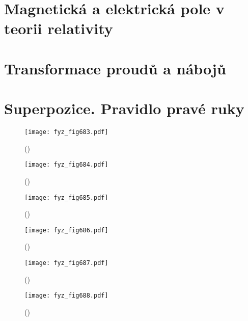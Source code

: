   \section{ Magnetická a elektrická pole v teorii relativity}\label{fyz:IIchapXIIIsecVI}
  \section{Transformace proudů a nábojů}\label{fyz:IIchapXIIIsecVII}
  \section{Superpozice. Pravidlo pravé ruky}\label{fyz:IIchapXIIIsecVIII}


    \begin{figure}[ht!] %
      \centering
      \texttt{[image: fyz\_fig683.pdf]}
      \caption{
               (\cite[s.~707]{Feynman02})}
      \label{fyz_fig683}
    \end{figure}

    \begin{figure}[ht!] %
      \centering
      \texttt{[image: fyz\_fig684.pdf]}
      \caption{
               (\cite[s.~707]{Feynman02})}
      \label{fyz_fig684}
    \end{figure}

    \begin{figure}[ht!] %
      \centering
      \texttt{[image: fyz\_fig685.pdf]}
      \caption{
               (\cite[s.~707]{Feynman02})}
      \label{fyz_fig685}
    \end{figure}

    \begin{figure}[ht!] %
      \centering
      \texttt{[image: fyz\_fig686.pdf]}
      \caption{
               (\cite[s.~707]{Feynman02})}
      \label{fyz_fig686}
    \end{figure}

    \begin{figure}[ht!] %
      \centering
      \texttt{[image: fyz\_fig687.pdf]}
      \caption{
               (\cite[s.~707]{Feynman02})}
      \label{fyz_fig687}
    \end{figure}

    \begin{figure}[ht!] %
      \centering
      \texttt{[image: fyz\_fig688.pdf]}
      \caption{
               (\cite[s.~707]{Feynman02})}
      \label{fyz_fig688}
    \end{figure}


\printbibliography[title={Seznam literatury}, heading=subbibliography]
